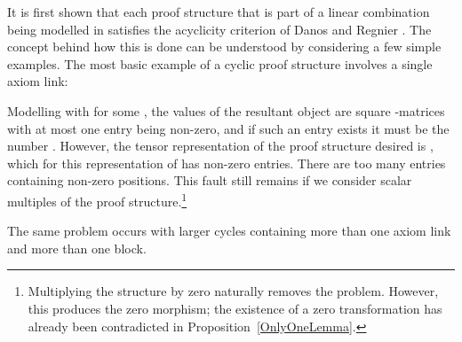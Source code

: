 \documentclass{LMCS}
\theoremstyle{plain}\newtheorem*{cLm}{Claim}
\newcommand{\p}{} \newcommand{\N}{\mathbb{N}}
\begin{document}
It is first shown that each proof structure that is part of a linear combination being modelled in  satisfies the acyclicity criterion of Danos and Regnier \cite{DR89}. The concept behind how this is done can be understood by considering a few simple examples. The most basic example of a cyclic proof structure involves a single axiom link:
\begin{center} \vspace{5mm}
 \vspace{5mm}
\end{center}

\p Modelling  with  for some , the values of the resultant object are square -matrices with at most one entry being non-zero, and if such an entry exists it must be the number . However, the tensor representation of the proof structure desired is , which for this representation of  has  non-zero entries. There are too many entries containing non-zero positions. This fault still remains if we consider scalar multiples of the proof structure.\footnote{Multiplying the structure by zero naturally removes the problem. However, this produces the zero morphism; the existence of a zero transformation has already been contradicted in Proposition~\ref{OnlyOneLemma}.}

The same problem occurs with larger cycles containing more than one axiom link and more than one block.
\begin{center} \vspace{5mm}
 \vspace{5mm}
\end{center}
\end{document}
